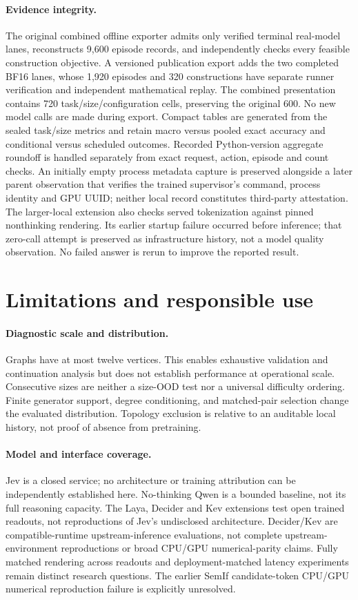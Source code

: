\paragraph{Evidence integrity.}
The original combined offline exporter admits only verified terminal real-model
lanes, reconstructs 9,600 episode records, and independently checks every feasible
construction objective. A versioned publication export adds the two completed
BF16 lanes, whose 1,920 episodes and 320 constructions have separate runner
verification and independent mathematical replay. The combined presentation
contains 720 task/size/configuration cells, preserving the original 600.
No new model calls are made during export.
Compact tables are generated from the sealed task/size metrics and retain
macro versus pooled exact accuracy and conditional versus scheduled outcomes.
Recorded Python-version aggregate roundoff is handled separately from exact
request, action, episode and count checks. An initially empty process
metadata capture is preserved alongside a later parent observation that
verifies the trained supervisor's command, process identity and GPU UUID;
neither local record constitutes third-party attestation.
The larger-local extension also checks served tokenization against pinned
nonthinking rendering. Its earlier startup failure occurred before inference;
that zero-call attempt is preserved as infrastructure history, not a model
quality observation. No failed answer is rerun to improve the reported result.

\section{Limitations and responsible use}
\label{app:extended-limits}
\paragraph{Diagnostic scale and distribution.}
Graphs have at most twelve vertices. This enables exhaustive validation and
continuation analysis but does not establish performance at operational
scale. Consecutive sizes are neither a size-OOD test nor a universal difficulty
ordering. Finite generator support, degree conditioning, and matched-pair
selection change the evaluated distribution. Topology exclusion is relative
to an auditable local history, not proof of absence from pretraining.

\paragraph{Model and interface coverage.}
Jev is a closed service; no architecture or training attribution can be
independently established here. No-thinking Qwen is a bounded baseline,
not its full reasoning capacity. The Laya, Decider and Kev extensions test
open trained readouts, not reproductions of Jev's undisclosed architecture.
Decider/Kev are compatible-runtime upstream-inference evaluations, not complete
upstream-environment reproductions or broad CPU/GPU numerical-parity claims.
Fully matched
rendering across readouts and deployment-matched latency experiments remain
distinct research questions. The earlier SemIf candidate-token CPU/GPU
numerical reproduction failure is explicitly unresolved.


